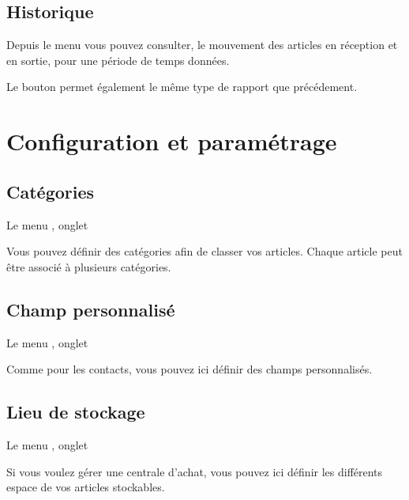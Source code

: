 \documentclass[a4paper,10pt,oneside,french]{sphinxmanual}
\begin{document}
\subsection{Historique}
\label{\detokenize{invoice/stock:historique}}
Depuis le menu  vous pouvez consulter, le mouvement des articles en réception et en sortie, pour une période de temps données.

Le bouton  permet également le même type de rapport que précédement.


\section{Configuration et paramétrage}
\label{\detokenize{invoice/configuration::doc}}\label{\detokenize{invoice/configuration:configuration-et-parametrage}}

\subsection{Catégories}
\label{\detokenize{invoice/configuration:categories}}
Le menu , onglet 

Vous pouvez définir des catégories afin de classer vos articles.
Chaque article peut être associé à plusieurs catégories.


\subsection{Champ personnalisé}
\label{\detokenize{invoice/configuration:champ-personnalise}}
Le menu , onglet 

Comme pour les contacts, vous pouvez ici définir des champs personnalisés.


\subsection{Lieu de stockage}
\label{\detokenize{invoice/configuration:lieu-de-stockage}}
Le menu , onglet 

Si vous voulez gérer une centrale d’achat, vous pouvez ici définir les différents espace de vos articles stockables.
\end{document}
